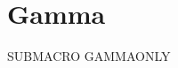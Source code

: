 \documentclass{article}
\newcommand{\SubMacro}{SUBMACRO}
\begin{document}
\section{Gamma}
\RootMacro
\SubMacro
GAMMAONLY
\end{document}
